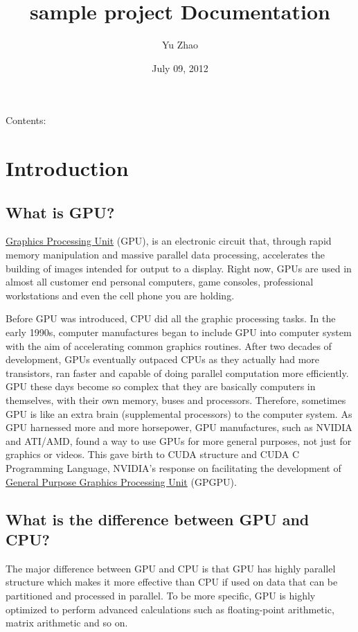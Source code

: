 \documentclass[letterpaper,10pt,english]{sphinxmanual}
\title{sample project Documentation}
\date{July 09, 2012}
\author{Yu Zhao}
\begin{document}
\maketitle
\tableofcontents
{}\label{index::doc}


Contents:


\chapter{Introduction}
\label{Introduction/Introduction:introduction}\label{Introduction/Introduction:gpu-programming}\label{Introduction/Introduction::doc}

\section{What is GPU?}
\label{Introduction/Introduction:what-is-gpu}
\href{http://en.wikipedia.org/wiki/GPU}{Graphics Processing Unit} (GPU), is an electronic circuit that, through rapid memory manipulation and massive parallel data processing, accelerates the building of images intended for output to a display. Right now, GPUs are used in almost all customer end personal computers, game consoles, professional workstations and even the cell phone you are holding.

Before GPU was introduced, CPU did all the graphic processing tasks. In the early 1990s, computer manufactures began to include GPU into computer system with the aim of accelerating common graphics routines. After two decades of development, GPUs eventually outpaced CPUs as they actually had more transistors, ran faster and capable of doing parallel computation more efficiently. GPU these days become so complex that they are basically computers in themselves, with their own memory, buses and processors. Therefore, sometimes GPU is like an extra brain (supplemental processors) to the computer system. As GPU harnessed more and more horsepower, GPU manufactures, such as NVIDIA and ATI/AMD, found a way to use GPUs  for more general purposes, not just for graphics or videos. This gave birth to CUDA structure and CUDA C Programming Language, NVIDIA's response on facilitating the development of \href{http://en.wikipedia.org/wiki/GPGPU}{General Purpose Graphics Processing Unit} (GPGPU).


\section{What is the difference between GPU and CPU?}
\label{Introduction/Introduction:general-purpose-graphics-processing-unit}\label{Introduction/Introduction:what-is-the-difference-between-gpu-and-cpu}
The major difference between GPU and CPU is that GPU has highly parallel structure which makes it more effective than CPU if used on data that can be partitioned and processed in parallel. To be more specific, GPU is highly optimized to perform advanced calculations such as floating-point arithmetic, matrix arithmetic and so on.
\end{document}
